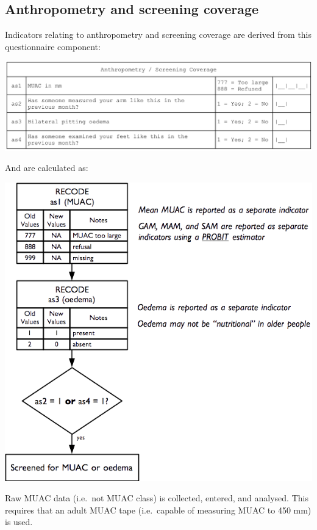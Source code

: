 \documentclass[12pt,a4paper]{book}
\theoremstyle{definition}
\theoremstyle{definition}
\theoremstyle{definition}
\theoremstyle{remark}
\begin{document}
\newpage

\hypertarget{anthropometry-and-screening-coverage}{%
\subsection{Anthropometry and screening
coverage}\label{anthropometry-and-screening-coverage}}

Indicators relating to anthropometry and screening coverage are derived
from this questionnaire component:

\begin{center}\includegraphics{figures/questionnaire11} \end{center}

And are calculated as:

\begin{center}\includegraphics{figures/indicators25} \end{center}

Raw MUAC data (i.e.~not MUAC class) is collected, entered, and analysed.
This requires that an adult MUAC tape (i.e.~capable of measuring MUAC to
450 mm) is used.
\end{document}
